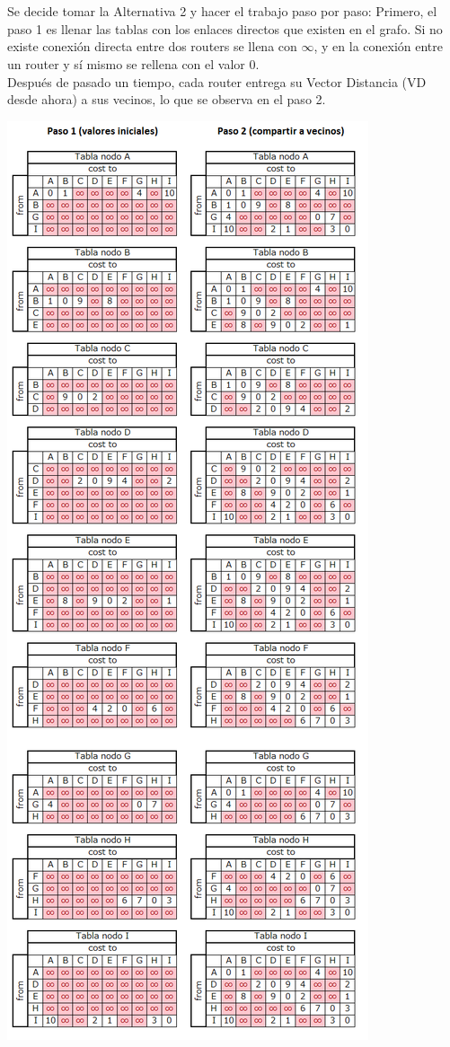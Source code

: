 \documentclass{article}
\begin{document}
\section{}
Se decide tomar la Alternativa 2 y hacer el trabajo paso por paso:
Primero, el paso 1 es llenar las tablas con los enlaces directos que existen en el grafo. Si no existe conexión directa entre dos routers se llena con $\infty$, y en la conexión entre un router y sí mismo se rellena con el valor 0.\\
Después de pasado un tiempo, cada router entrega su Vector Distancia (VD desde ahora) a sus vecinos, lo que se observa en el paso 2.\\
\centerline{\includegraphics[scale=0.6]{Img/paso12.png}}\\
\end{document}
